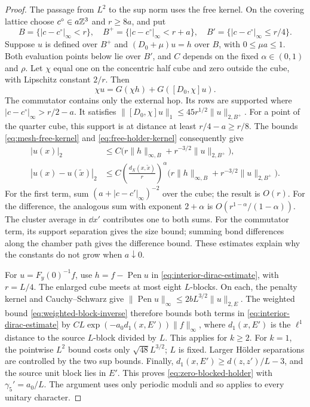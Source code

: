 \begin{proof}
The passage from $L^2$ to the sup norm uses the free kernel. On the
covering lattice choose $c^\circ\in a\mathbb Z^3$ and $r\ge8a$, and put
\[
 B=\{|c-c^\circ|_\infty<r\},\quad
 B^+=\{|c-c^\circ|_\infty<r+a\},\quad
 B'=\{|c-c^\circ|_\infty\le r/4\}.
\]
Suppose $u$ is defined over $B^+$ and $(D_0+\mu)u=h$ over $B$,
with $0\le\mu a\le1$. Both evaluation points below lie over $B'$,
and $C$ depends on the fixed $\alpha\in(0,1)$ and $\rho$.
Let $\chi$ equal one
on the concentric half cube and zero outside the cube, with Lipschitz
constant $2/r$. Then
\[
 \chi u=G(\chi h)+G([D_0,\chi]u).
\]
The commutator contains only the external hop. Its rows are supported
where $|c-c^\circ|_\infty>r/2-a$. It satisfies
$\|[D_0,\chi]u\|_1\le45r^{1/2}\|u\|_{2,B^+}$.
For a point of the quarter cube, this support is at distance at least
$r/4-a\ge r/8$. The bounds \eqref{eq:mesh-free-kernel} and
\eqref{eq:free-holder-kernel} consequently give
\begin{equation}\label{eq:interior-dirac-estimate}
 \begin{split}
 |u(x)|_2&\le C\big(r\|h\|_{\infty,B}+r^{-3/2}\|u\|_{2,B^+}\big),\\
 |u(x)-u(\widetilde x)|_2&\le
 C\left(\frac{d_X(x,\widetilde x)}r\right)^\alpha
       \big(r\|h\|_{\infty,B}+r^{-3/2}\|u\|_{2,B^+}\big).
 \end{split}
\end{equation}
For the first term, sum $(a+|c-c'|_\infty)^{-2}$ over the cube;
the result is $O(r)$. For the difference, the analogous sum with
exponent $2+\alpha$ is $O(r^{1-\alpha}/(1-\alpha))$.
The cluster average in $\dd x'$ contributes one to both sums.
For the commutator term, its support separation gives the size bound;
summing bond differences along the chamber path gives the difference
bound. These estimates explain why the constants do not grow when
$a\downarrow0$.

For $u=F_y(0)^{-1}f$, use
$h=f-\operatorname{Pen}u$ in \eqref{eq:interior-dirac-estimate}, with
$r=L/4$. The enlarged cube meets at most eight $L$-blocks. On each,
the penalty kernel and Cauchy--Schwarz give
$\|\operatorname{Pen}u\|_\infty\le2bL^{3/2}\|u\|_{2,E}$.
The weighted bound \eqref{eq:weighted-block-inverse} therefore bounds
both terms in \eqref{eq:interior-dirac-estimate} by
$CL\exp(-a_0d_1(x,E'))\|f\|_\infty$, where
$d_1(x,E')$ is the $\ell^1$ distance to the source $L$-block divided
by $L$. This applies for $k\ge2$.
For $k=1$, the pointwise $L^2$ bound costs only
$\sqrt{48}L^{3/2}$; $L$ is fixed. Larger Hölder separations are
controlled by the two sup bounds. Finally,
$d_1(x,E')\ge d(z,z')/L-3$, and the source unit block lies in $E'$.
This proves \eqref{eq:zero-blocked-holder} with
$\gamma_5'=a_0/L$. The argument uses only periodic moduli and so
applies to every unitary character.
\end{proof}

